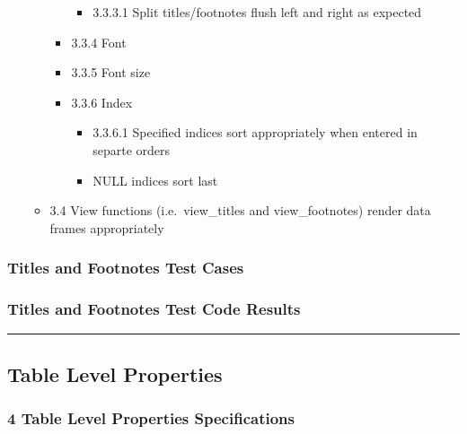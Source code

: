 \documentclass[]{article}
\providecommand{\tightlist}{%
  \setlength{\itemsep}{0pt}\setlength{\parskip}{0pt}}
\begin{document}
\begin{itemize}
\begin{itemize}
\begin{itemize}
      \begin{itemize}
      \tightlist
      \item
        3.3.3.1 Split titles/footnotes flush left and right as expected
      \end{itemize}
    \item
      3.3.4 Font
    \item
      3.3.5 Font size
    \item
      3.3.6 Index

      \begin{itemize}
      \tightlist
      \item
        3.3.6.1 Specified indices sort appropriately when entered in
        separte orders
      \item
        NULL indices sort last
      \end{itemize}
    \end{itemize}
  \item
    3.4 View functions (i.e.~view\_titles and view\_footnotes) render
    data frames appropriately
  \end{itemize}
\end{itemize}

\hypertarget{titles-and-footnotes-test-cases}{%
\subsubsection{Titles and Footnotes Test
Cases}\label{titles-and-footnotes-test-cases}}

\hypertarget{titles-and-footnotes-test-code-results}{%
\subsubsection{Titles and Footnotes Test Code
Results}\label{titles-and-footnotes-test-code-results}}

\begin{center}\rule{0.5\linewidth}{0.5pt}\end{center}

\hypertarget{table-level-properties}{%
\subsection{Table Level Properties}\label{table-level-properties}}

\hypertarget{table-level-properties-specifications}{%
\subsubsection{4 Table Level Properties
Specifications}\label{table-level-properties-specifications}}
\end{document}
